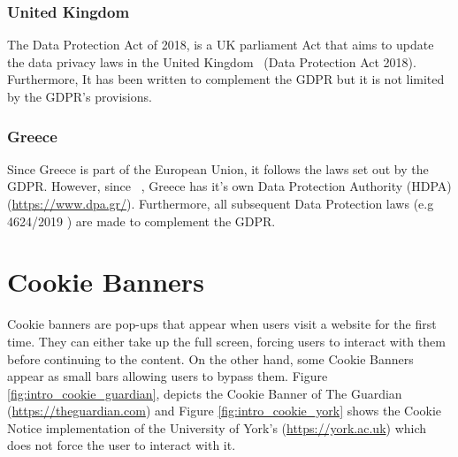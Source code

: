 \documentclass[../main.tex]{subfiles}
\begin{document}
\subsubsection{United Kingdom}
The Data Protection Act of 2018, is a UK parliament Act that aims to update the data privacy laws in the United Kingdom~\cite{dpa_2018} (Data Protection Act 2018). Furthermore, It has been written to complement the GDPR but it is not limited by the GDPR’s provisions. 

\subsubsection{Greece}
Since Greece is part of the European Union, it follows the laws set out by the GDPR. However, since ~\cite{gdpr_legal_text}, Greece has it's own Data Protection Authority (HDPA) (\url{https://www.dpa.gr/}). Furthermore, all subsequent Data Protection laws (e.g 4624/2019 \cite{gr_gdpr_law}) are made to complement the GDPR. 

\section{Cookie Banners}
Cookie banners are pop-ups that appear when users visit a website for the first time. They can either take up the full screen, forcing users to interact with them before continuing to the content. On the other hand, some Cookie Banners appear as small bars allowing users to bypass them. Figure \ref{fig:intro_cookie_guardian}, depicts the  Cookie Banner of The Guardian (\url{https://theguardian.com}) and Figure \ref{fig:intro_cookie_york} shows the Cookie Notice implementation of the University of York’s (\url{https://york.ac.uk}) which does not force the user to interact with it. 
\end{document}
